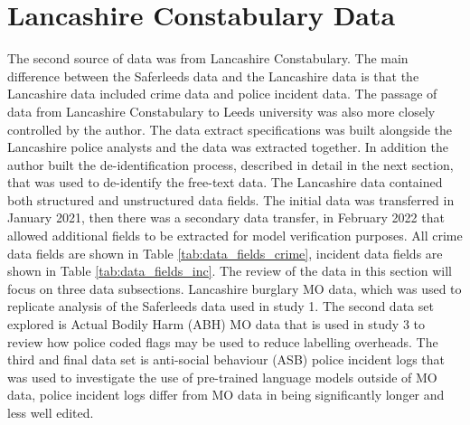 \section{Lancashire Constabulary Data} The second source of data was from Lancashire Constabulary. The main difference between the Saferleeds data and the Lancashire data is that the Lancashire data included crime data and police incident data. The passage of data from Lancashire Constabulary to Leeds university was also more closely controlled by the author. The data extract specifications was built alongside the Lancashire police analysts and the data was extracted together. In addition the author built the de-identification process, described in detail in the next section, that was used to de-identify the free-text data. The Lancashire data contained both structured and unstructured data fields. The initial data was transferred in January 2021, then there was a secondary data transfer, in February 2022 that allowed additional fields to be extracted for model verification purposes. All crime data fields are shown in Table \ref{tab:data_fields_crime}, incident data fields are shown in Table \ref{tab:data_fields_inc}. The review of the data in this section will focus on three data subsections. Lancashire burglary MO data, which was used to replicate analysis of the Saferleeds data used in study 1. The second data set explored is Actual Bodily Harm (ABH) MO data that is used in study 3 to review how police coded flags may be used to reduce labelling overheads. The third and final data set is anti-social behaviour (ASB) police incident logs that was used to investigate the use of pre-trained language models outside of MO data, police incident logs differ from MO data in being significantly longer and less well edited.  





